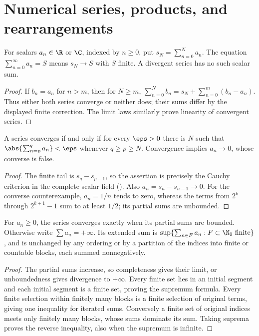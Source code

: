 \chapter{Numerical series, products, and rearrangements}

\begin{definition}
For scalars $a_n\in\R$ or $\C$, indexed by $n\geq0$, put $s_N=\sum_{n=0}^N a_n$. The equation $\sum_{n=0}^\infty a_n=S$ means $s_N\to S$ with $S$ finite. A divergent series has no such scalar sum.
\end{definition}
\begin{proof}
If $b_n=a_n$ for $n>m$, then for $N\geq m$, $\sum_{n=0}^N b_n=s_N+\sum_{n=0}^m(b_n-a_n)$. Thus either both series converge or neither does; their sums differ by the displayed finite correction. The limit laws similarly prove linearity of convergent series.
\end{proof}

\begin{theorem}
A series converges if and only if for every $\eps>0$ there is $N$ such that $\abs{\sum_{n=p}^q a_n}<\eps$ whenever $q\geq p\geq N$. Convergence implies $a_n\to0$, whose converse is false.
\end{theorem}
\begin{proof}
The finite tail is $s_q-s_{p-1}$, so the assertion is precisely the Cauchy criterion in the complete scalar field (). Also $a_n=s_n-s_{n-1}\to0$. For the converse counterexample, $a_n=1/n$ tends to zero, whereas the terms from $2^k$ through $2^{k+1}-1$ sum to at least $1/2$; its partial sums are unbounded.
\end{proof}

\begin{theorem}
For $a_n\geq0$, the series converges exactly when its partial sums are bounded. Otherwise write $\sum a_n=+\infty$. Its extended sum is $\sup\{\sum_{n\in F}a_n:F\subset\N_0\text{ finite}\}$, and is unchanged by any ordering or by a partition of the indices into finite or countable blocks, each summed nonnegatively.
\end{theorem}
\begin{proof}
The partial sums increase, so completeness gives their limit, or unboundedness gives divergence to $+\infty$. Every finite set lies in an initial segment and each initial segment is a finite set, proving the supremum formula. Every finite selection within finitely many blocks is a finite selection of original terms, giving one inequality for iterated sums. Conversely a finite set of original indices meets only finitely many blocks, whose sums dominate its sum. Taking suprema proves the reverse inequality, also when the supremum is infinite.
\end{proof}

